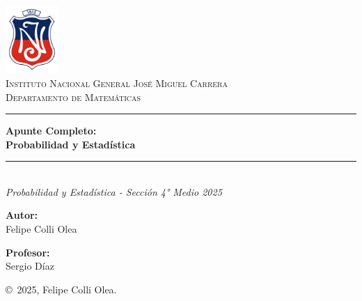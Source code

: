 \documentclass[12pt, letterpaper]{article}
\begin{document}
\pagestyle{fancy}
\fancyhf{} %
\fancyfoot[R]{\thepage} %
\renewcommand{\headrulewidth}{0pt} %

\begin{titlepage}
	\centering
	\includegraphics[width=2cm]{IN}\\[2cm]
	\textsc{\LARGE  Instituto Nacional General José Miguel Carrera}\\[0.5cm]
	\textsc{\Large Departamento de Matemáticas}\\[1.5cm]

	\rule{\textwidth}{1.5pt}\vspace{0.4cm}
	{\Huge \bfseries Apunte Completo: \\[0.5cm] Probabilidad y Estadística}\\[0.4cm]
	\rule{\textwidth}{1.5pt}\\[1.5cm]

	{\Large \textit{ Probabilidad y Estadística - Sección 4° Medio 2025}}\\[2cm]

	\begin{minipage}{0.45\textwidth}
		\begin{flushleft} \large
			\textbf{Autor:}\\
			Felipe Colli Olea
		\end{flushleft}
	\end{minipage}
	\hfill
	\begin{minipage}{0.45\textwidth}
		\begin{flushright} \large
			\textbf{Profesor:}\\
			Sergio Díaz
		\end{flushright}
	\end{minipage}

	\vfill
    \copyright~2025, Felipe Colli Olea.
\end{titlepage}
\end{document}
